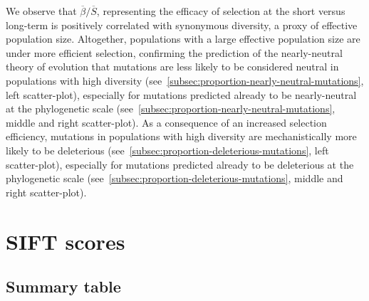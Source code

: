 \documentclass{article}
\newcommand{\Sphy}{S}
\newcommand{\SphyMean}{\overline{\Sphy}}
\newcommand{\Spop}{\beta}
\newcommand{\SpopMean}{\overline{\Spop}}
\begin{document}
    We observe that $\SpopMean/\SphyMean$, representing the efficacy of selection at the short versus long-term is positively correlated with synonymous diversity, a proxy of effective population size.
    Altogether, populations with a large effective population size are under more efficient selection, confirming the prediction of the nearly-neutral theory of evolution that mutations are less likely to be considered neutral in populations with high diversity (see~\ref{subsec:proportion-nearly-neutral-mutations}, left scatter-plot), especially for mutations predicted already to be nearly-neutral at the phylogenetic scale (see~\ref{subsec:proportion-nearly-neutral-mutations}, middle and right scatter-plot).
    As a consequence of an increased selection efficiency, mutations in populations with high diversity are mechanistically more likely to be deleterious (see~\ref{subsec:proportion-deleterious-mutations}, left scatter-plot), especially for mutations predicted already to be deleterious at the phylogenetic scale (see~\ref{subsec:proportion-deleterious-mutations}, middle and right scatter-plot).
    
    

    \newpage
    \section{SIFT scores}\label{sec:sift-scores}

    \subsection{Summary table}\label{subsec:summary-table-sift-scores}
\end{document}
